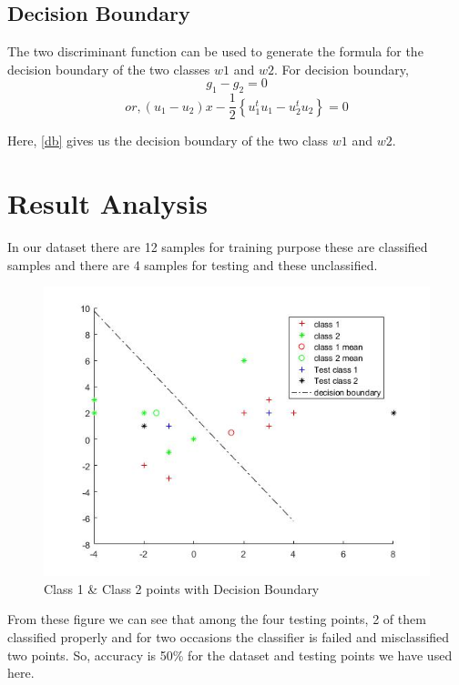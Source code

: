 \subsection{Decision Boundary}
The two discriminant function can be used to generate the formula for the decision boundary of the two classes $w1$ and $w2$.
For decision boundary,\\
\[
    g_{1} - g_{2} = 0
\]
\[or,
    \left ( u_{1} - u_{2} \right )x - \frac{1}{2}\left\{ u_{1}^t u_{1} - u_{2}^t u_{2}\right\} = 0 \label{db}\tag{3}
\]

Here, \eqref{db} gives us the decision boundary of the two class $w1$ and $w2$.

\section{Result Analysis}
In our dataset there are 12 samples for training purpose these are classified samples and there are 4 samples for testing and these unclassified.
\begin{figure}[ht]
\begin{minipage}[c]{\linewidth}
\includegraphics[height=.9\linewidth,width=\linewidth]{final.jpg}
\caption{Class 1 \& Class 2 points with Decision Boundary}
\end{minipage}
\end{figure}
From these figure we can see that among the four testing points, 2 of them classified properly and for two occasions the classifier is failed and misclassified two points. So, accuracy is 50\% for the dataset and testing points we have used here.

